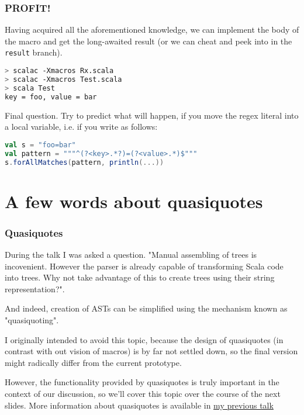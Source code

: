 \documentclass[hyperref={bookmarks=false}]{beamer}
\begin{document}
\begin{frame}[t,fragile]
\frametitle{PROFIT!}

Having acquired all the aforementioned knowledge, we can implement the body of the macro and get the long-awaited result (or we can cheat and peek into  in the \texttt{result} branch).

\begin{lstlisting}[language=bash]
> scalac -Xmacros Rx.scala
> scalac -Xmacros Test.scala
> scala Test
key = foo, value = bar
\end{lstlisting}

Final question. Try to predict what will happen, if you move the regex literal into a local variable, i.e. if you write as follows:

\begin{lstlisting}[language=scala]
val s = "foo=bar"
val pattern = """^(?<key>.*?)=(?<value>.*)$"""
s.forAllMatches(pattern, println(...))
\end{lstlisting}%
\end{frame}

\section{A few words about quasiquotes}

\begin{frame}[t,fragile]
\frametitle{Quasiquotes}

During the talk I was asked a question. "Manual assembling of trees is incovenient. However the parser is already capable of transforming Scala code into trees. Why not take advantage of this to create trees using their string representation?".

And indeed, creation of ASTs can be simplified using the mechanism known as "quasiquoting".

I originally intended to avoid this topic, because the design of quasiquotes (in contrast with out vision of macros) is by far not settled down, so the final version might radically differ from the current prototype.

However, the functionality provided by quasiquotes is truly important in the context of our discussion, so we'll cover this topic over the course of the next slides. More information about quasiquotes is available in {\color{linkblue}\href{http://scalamacros.org/talks/2011-10-18-WhatsUp.pdf}{my previous talk}}
\end{frame}
\end{document}
